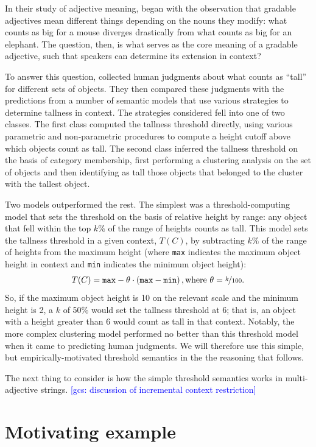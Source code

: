 \documentclass[10pt,a4paper]{article}
\newcommand{\gcs}[1]{\textcolor{blue}{[gcs: #1]}}
\begin{document}
In their study of adjective meaning,  began with the observation that gradable adjectives mean different things depending on the nouns they modify: what counts as big for a mouse diverges drastically from what counts as big for an elephant. The question, then, is what serves as the core meaning of a gradable adjective, such that speakers can determine its extension in context? 
 
To answer this question, \citeauthor{schmidtetal2009} collected human judgments about what counts as ``tall'' for different sets of objects. They then compared these judgments with the predictions from a number of semantic models that use various strategies to determine tallness in context. The strategies considered fell into one of two classes. The first class computed the tallness threshold directly, using various parametric and non-parametric procedures to compute a height cutoff above which objects count as tall. The second class inferred the tallness threshold on the basis of category membership, first performing a clustering analysis on the set of objects and then identifying as tall those objects that belonged to the cluster with the tallest object.

Two models outperformed the rest. The simplest was a threshold-computing model that sets the threshold on the basis of relative height by range: any object that fell within the top $k\%$ of the range of heights counts as tall. This model sets the tallness threshold in a given context, $T(C)$, by subtracting $k\%$ of the range of heights from the maximum height (where \texttt{max} indicates the maximum object height in context and \texttt{min} indicates the minimum object height):
$$T(C) = \texttt{max} - \theta \cdot (\texttt{max} - \texttt{min})\,, \text{where $\theta = \nicefrac{k}{100}$.}$$
So, if the maximum object height is 10 on the relevant scale and the minimum height is 2, a $k$ of 50\% would set the tallness threshold at 6; that is, an object with a height greater than 6 would count as tall in that context. Notably, the more complex clustering model performed no better than this threshold model when it came to predicting human judgments.
We will therefore use this simple, but empirically-motivated threshold semantics in the the reasoning that follows. 

The next thing to consider is how the simple threshold semantics works in multi-adjective strings. \gcs{discussion of incremental context restriction}


\section{Motivating example}
\end{document}
